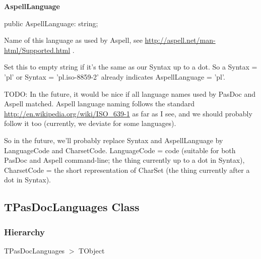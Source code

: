 \documentclass{report}
\newif\ifpdf
\begin{document}
\begin{list}{}
\begin{flushleft}
\ifpdf
\end{flushleft}
\fi


\par  \label{PasDoc_Languages.TLanguageRecord-AspellLanguage}
\item[\textbf{AspellLanguage}\hfill]
\ifpdf
\begin{flushleft}
\fi
\begin{ttfamily}
public AspellLanguage: string;\end{ttfamily}

\ifpdf
\end{flushleft}
\fi


\par Name of this language as used by Aspell, see \href{http://aspell.net/man-html/Supported.html}{http://aspell.net/man-html/Supported.html} .

Set this to empty string if it's the same as our Syntax up to a dot. So a Syntax = 'pl' or Syntax = 'pl.iso{-}8859{-}2' already indicates AspellLanguage = 'pl'.

TODO: In the future, it would be nice if all language names used by PasDoc and Aspell matched. Aspell language naming follows the standard \href{http://en.wikipedia.org/wiki/ISO_639-1}{http://en.wikipedia.org/wiki/ISO{\_}639-1} as far as I see, and we should probably follow it too (currently, we deviate for some languages).

So in the future, we'll probably replace Syntax and AspellLanguage by LanguageCode and CharsetCode. LanguageCode = code (suitable for both PasDoc and Aspell command{-}line; the thing currently up to a dot in Syntax), CharsetCode = the short representation of CharSet (the thing currently after a dot in Syntax).\end{list}
\ifpdf
\subsection*{\large{\textbf{TPasDocLanguages Class}}\normalsize\hspace{1ex}\hrulefill}
\else
\subsection*{TPasDocLanguages Class}
\fi
\label{PasDoc_Languages.TPasDocLanguages}
\subsubsection*{\large{\textbf{Hierarchy}}\normalsize\hspace{1ex}\hfill}
TPasDocLanguages {$>$} TObject
\end{document}
